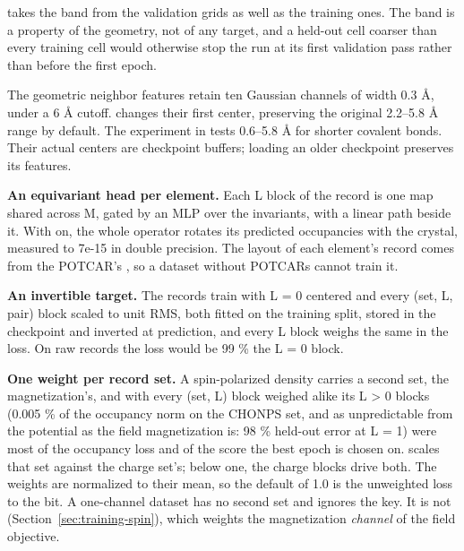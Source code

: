  takes the band from the validation grids as well as the training ones. The band is a property of the geometry, not of any target, and a held-out cell coarser than every training cell would otherwise stop the run at its first validation pass rather than before the first epoch.

The geometric neighbor features retain ten Gaussian channels of width 0.3 \AA{}, under a 6 \AA{} cutoff.  changes their first center, preserving the original 2.2--5.8 \AA{} range by default. The experiment in  tests 0.6--5.8 \AA{} for shorter covalent bonds. Their actual centers are checkpoint buffers; loading an older checkpoint preserves its features.

\textbf{An equivariant head per element.} Each L block of the record is one map shared across M, gated by an MLP over the invariants, with a linear path beside it. With  on, the whole operator rotates its predicted occupancies with the crystal, measured to 7e-15 in double precision. The layout of each element's record comes from the POTCAR's , so a dataset without POTCARs cannot train it.

\textbf{An invertible target.} The records train with L = 0 centered and every (set, L, pair) block scaled to unit RMS, both fitted on the training split, stored in the checkpoint and inverted at prediction, and every L block weighs the same in the loss. On raw records the loss would be 99 \% the L = 0 block.

\textbf{One weight per record set.} A spin-polarized density carries a second set, the magnetization's, and with every (set, L) block weighed alike its L \textgreater{} 0 blocks (0.005 \% of the occupancy norm on the CHONPS set, and as unpredictable from the potential as the field magnetization is: 98 \% held-out error at L = 1) were most of the occupancy loss and of the score the best epoch is chosen on.  scales that set against the charge set's; below one, the charge blocks drive both. The weights are normalized to their mean, so the default of 1.0 is the unweighted loss to the bit. A one-channel dataset has no second set and ignores the key. It is not  (Section~\ref{sec:training-spin}), which weights the magnetization \emph{channel} of the field objective.

